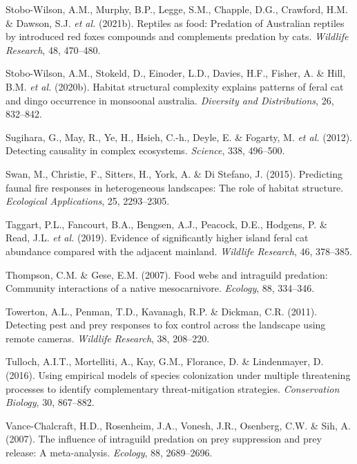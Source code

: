\documentclass[11pt,a4paper,titlepage,twoside,openright]{style/unimelbthesis}
\begin{document}
\begin{mainmatter}
\leavevmode\hypertarget{ref-stobo2021reptiles}{}%
Stobo-Wilson, A.M., Murphy, B.P., Legge, S.M., Chapple, D.G., Crawford, H.M. \& Dawson, S.J. \emph{et al.} (2021b). Reptiles as food: Predation of Australian reptiles by introduced red foxes compounds and complements predation by cats. \emph{Wildlife Research}, 48, 470--480.

\leavevmode\hypertarget{ref-stobo2020habitat}{}%
Stobo-Wilson, A.M., Stokeld, D., Einoder, L.D., Davies, H.F., Fisher, A. \& Hill, B.M. \emph{et al.} (2020b). Habitat structural complexity explains patterns of feral cat and dingo occurrence in monsoonal australia. \emph{Diversity and Distributions}, 26, 832--842.

\leavevmode\hypertarget{ref-sugihara2012detecting}{}%
Sugihara, G., May, R., Ye, H., Hsieh, C.-h., Deyle, E. \& Fogarty, M. \emph{et al.} (2012). Detecting causality in complex ecosystems. \emph{Science}, 338, 496--500.

\leavevmode\hypertarget{ref-swan2015predicting}{}%
Swan, M., Christie, F., Sitters, H., York, A. \& Di Stefano, J. (2015). Predicting faunal fire responses in heterogeneous landscapes: The role of habitat structure. \emph{Ecological Applications}, 25, 2293--2305.

\leavevmode\hypertarget{ref-taggart2019evidence}{}%
Taggart, P.L., Fancourt, B.A., Bengsen, A.J., Peacock, D.E., Hodgens, P. \& Read, J.L. \emph{et al.} (2019). Evidence of significantly higher island feral cat abundance compared with the adjacent mainland. \emph{Wildlife Research}, 46, 378--385.

\leavevmode\hypertarget{ref-thompson2007food}{}%
Thompson, C.M. \& Gese, E.M. (2007). Food webs and intraguild predation: Community interactions of a native mesocarnivore. \emph{Ecology}, 88, 334--346.

\leavevmode\hypertarget{ref-towerton2011detecting}{}%
Towerton, A.L., Penman, T.D., Kavanagh, R.P. \& Dickman, C.R. (2011). Detecting pest and prey responses to fox control across the landscape using remote cameras. \emph{Wildlife Research}, 38, 208--220.

\leavevmode\hypertarget{ref-tulloch2016using}{}%
Tulloch, A.I.T., Mortelliti, A., Kay, G.M., Florance, D. \& Lindenmayer, D. (2016). Using empirical models of species colonization under multiple threatening processes to identify complementary threat-mitigation strategies. \emph{Conservation Biology}, 30, 867--882.

\leavevmode\hypertarget{ref-vance2007influence}{}%
Vance-Chalcraft, H.D., Rosenheim, J.A., Vonesh, J.R., Osenberg, C.W. \& Sih, A. (2007). The influence of intraguild predation on prey suppression and prey release: A meta-analysis. \emph{Ecology}, 88, 2689--2696.


\end{mainmatter}
\end{document}
